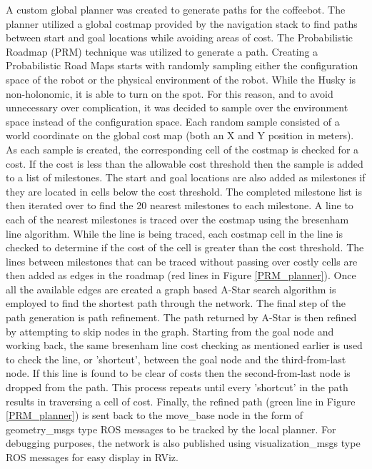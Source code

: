 \documentclass[letterpaper, 10 pt, conference]{ieeeconf}  %
\begin{document}
A custom global planner was created to generate paths for the coffeebot. The planner utilized a global costmap provided by the navigation stack to find paths between start and goal locations while avoiding areas of cost. The Probabilistic Roadmap (PRM) technique was utilized to generate a path. Creating a Probabilistic Road Maps starts with randomly sampling either the configuration space of the robot or the physical environment of the robot. While the Husky is non-holonomic, it is able to turn on the spot. For this reason, and to avoid unnecessary over complication, it was decided to sample over the environment space instead of the configuration space. Each random sample consisted of a world coordinate on the global cost map (both an X and Y position in meters). As each sample is created, the corresponding cell of the costmap is checked for a cost. If the cost is less than the allowable cost threshold then the sample is added to a list of milestones. The start and goal locations are also added as milestones if they are located in cells below the cost threshold. The completed milestone list is then iterated over to find the 20 nearest milestones to each milestone. A line to each of the nearest milestones is traced over the costmap using the bresenham line algorithm. While the line is being traced, each costmap cell in the line is checked to determine if the cost of the cell is greater than the cost threshold. The lines between milestones that can be traced without passing over costly cells are then added as edges in the roadmap (red lines in Figure \ref{PRM_planner}). Once all the available edges are created a graph based A-Star search algorithm is employed to find the shortest path through the network. The final step of the path generation is path refinement. The path returned by A-Star is then refined by attempting to skip nodes in the graph. Starting from the goal node and working back, the same bresenham line cost checking as mentioned earlier is used to check the line, or 'shortcut', between the goal node and the third-from-last node. If this line is found to be clear of costs then the second-from-last node is dropped from the path. This process repeats until every 'shortcut' in the path results in traversing a cell of cost.
Finally, the refined path (green line in Figure \ref{PRM_planner}) is sent back to the move\_base node in the form of geometry\_msgs type ROS messages to be tracked by the local planner. For debugging purposes, the network is also published using visualization\_msgs type ROS messages for easy display in RViz. 
\end{document}
